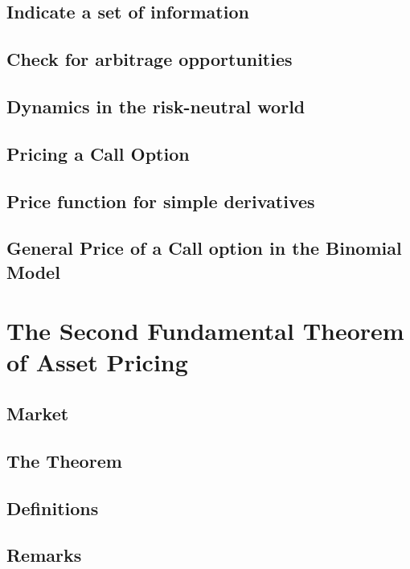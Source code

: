 \documentclass{beamer}
\numberwithin{equation}{section}
\begin{document}
\subsection{Indicate a set of information}
\subsection{Check for arbitrage opportunities}
\subsection{Dynamics in the risk-neutral world}
\subsection{Pricing a Call Option}
\subsection{Price function for simple derivatives}
\subsection{General Price of a Call option in the Binomial Model}

\section{The Second Fundamental Theorem of Asset Pricing}
\subsection{Market}
\subsection{The Theorem}
\subsection{Definitions}
\subsection{Remarks}
\end{document}
